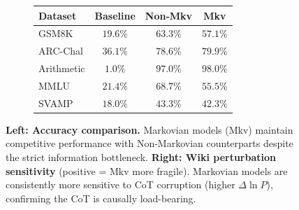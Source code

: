\documentclass{article} %
\begin{document}
\begin{figure}[t]
  \centering
    \begin{subfigure}[c]{0.42\textwidth}
        \centering
        \small
        \setlength{\tabcolsep}{3pt}
        \begin{tabular}{lccc}
            \toprule
            \textbf{Dataset} & \textbf{Baseline} & \textbf{Non-Mkv} & \textbf{Mkv} \\
            \midrule
            GSM8K & $19.6\%$ & $63.3\%$ & $57.1\%$ \\
            ARC-Chal & $36.1\%$ & $78.6\%$ & $79.9\%$ \\
            Arithmetic & $1.0\%$ & $97.0\%$ & $98.0\%$ \\
            MMLU & $21.4\%$ & $68.7\%$ & $55.5\%$ \\
            SVAMP & $18.0\%$ & $43.3\%$ & $42.3\%$ \\
            \bottomrule
        \end{tabular}
    \end{subfigure}
    \begin{subfigure}[c]{0.46\textwidth}
        \centering
    \end{subfigure}
    \caption{\textbf{Left: Accuracy comparison.} Markovian models (Mkv) maintain competitive performance with Non-Markovian counterparts despite the strict information bottleneck. \textbf{Right: Wiki perturbation sensitivity} (positive = Mkv more fragile). Markovian models are consistently more sensitive to CoT corruption (higher $\Delta \ln P$), confirming the CoT is causally load-bearing.}
    \label{fig:loss}
\end{figure}
\end{document}
